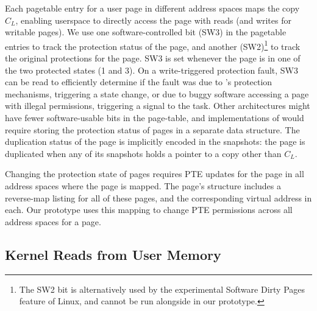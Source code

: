 \documentclass[letterpaper,twocolumn,10pt]{article}
\begin{document}
Each pagetable entry for a user page in different address spaces 
maps the copy $C_L$, enabling userspace to directly access the page
with reads (and writes for writable pages).
We use one software-controlled bit (SW3) in the pagetable entries 
to track the protection status of the page, and another 
(SW2)\footnote{The SW2 bit is alternatively used by the experimental Software Dirty Pages feature of 
Linux, and cannot be run alongside \tiktok in our prototype.}
to track the original protections for the page. 
SW3 is set whenever the page is in one of the two protected
states (1 and 3).
On a write-triggered protection fault, SW3 can be read to 
efficiently determine if the fault was due to \tiktok's protection 
mechanisms, triggering a state change, or due to buggy software
accessing a page with illegal permissions, triggering a signal to 
the task.
Other architectures might have fewer software-usable 
bits in the page-table, and implementations of \tiktok would 
require storing the protection status of pages in a separate data structure.
The duplication status of the page is implicitly encoded in the 
snapshots: the page is duplicated when any of its snapshots
holds a pointer to a copy other than $C_L$.

Changing the protection state of pages requires PTE updates
for the page in all address spaces where the page is mapped.
The page's  structure includes a reverse-map
listing for all of these pages, and the corresponding virtual
address in each.
Our prototype uses this mapping to change PTE permissions across
all address spaces for a page.


\subsection{Kernel Reads from User Memory}
\end{document}
